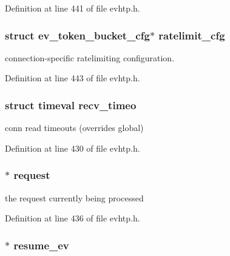\-Definition at line 441 of file evhtp.\-h.

\hypertarget{structevhtp__connection__s_a8b99b0e4db2727c4c0880feb16e7a7be}{
\subsubsection[{ratelimit\-\_\-cfg}]{\setlength{\rightskip}{0pt plus 5cm}struct ev\-\_\-token\-\_\-bucket\-\_\-cfg$\ast$ {\bf ratelimit\-\_\-cfg}}}\label{structevhtp__connection__s_a8b99b0e4db2727c4c0880feb16e7a7be}
connection-\/specific ratelimiting configuration. 

\-Definition at line 443 of file evhtp.\-h.

\hypertarget{structevhtp__connection__s_a485801666b7fb0cccc50d9fa42e5cbb9}{
\subsubsection[{recv\-\_\-timeo}]{\setlength{\rightskip}{0pt plus 5cm}struct timeval {\bf recv\-\_\-timeo}}}\label{structevhtp__connection__s_a485801666b7fb0cccc50d9fa42e5cbb9}
conn read timeouts (overrides global) 

\-Definition at line 430 of file evhtp.\-h.

\hypertarget{structevhtp__connection__s_a55db4995ccc7d4d06340bd057ff9f291}{
\subsubsection[{request}]{$\ast$ {\bf request}}}\label{structevhtp__connection__s_a55db4995ccc7d4d06340bd057ff9f291}
the request currently being processed 

\-Definition at line 436 of file evhtp.\-h.

\hypertarget{structevhtp__connection__s_a7a583b9c2322f322b8785b9cff0e9585}{
\subsubsection[{resume\-\_\-ev}]{$\ast$ {\bf resume\-\_\-ev}}}\label{structevhtp__connection__s_a7a583b9c2322f322b8785b9cff0e9585}


